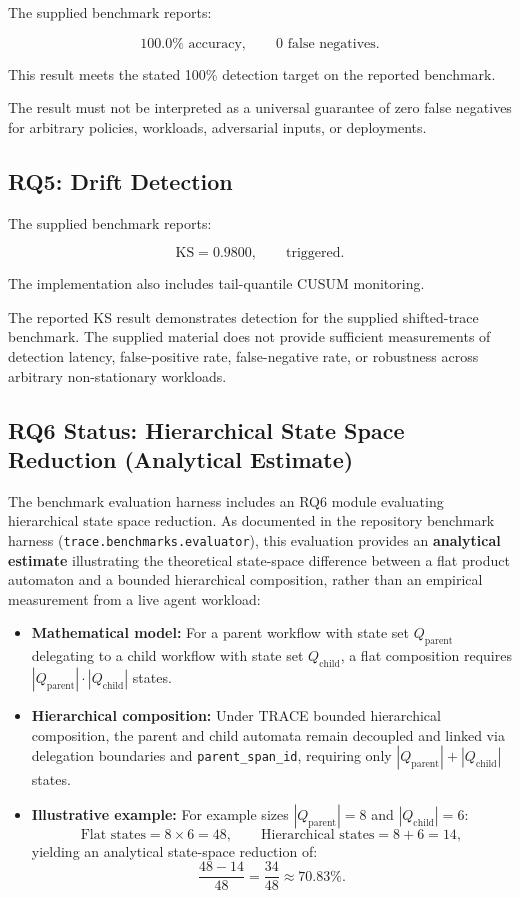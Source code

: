 \documentclass[11pt,a4paper]{article}
\begin{document}
The supplied benchmark reports:

\[
100.0\%\text{ accuracy},
\qquad
0\text{ false negatives}.
\]

This result meets the stated 100\% detection target on the reported benchmark.

The result must not be interpreted as a universal guarantee of zero false negatives for
arbitrary policies, workloads, adversarial inputs, or deployments.

\subsection{RQ5: Drift Detection}

The supplied benchmark reports:

\[
\mathrm{KS}=0.9800,
\qquad
\text{triggered}.
\]

The implementation also includes tail-quantile CUSUM monitoring.

The reported KS result demonstrates detection for the supplied shifted-trace benchmark.
The supplied material does not provide sufficient measurements of detection latency,
false-positive rate, false-negative rate, or robustness across arbitrary non-stationary
workloads.

\subsection{RQ6 Status: Hierarchical State Space Reduction (Analytical Estimate)}

The benchmark evaluation harness includes an RQ6 module evaluating hierarchical state space
reduction. As documented in the repository benchmark harness (\texttt{trace.benchmarks.evaluator}),
this evaluation provides an \textbf{analytical estimate} illustrating the theoretical state-space
difference between a flat product automaton and a bounded hierarchical composition, rather than
an empirical measurement from a live agent workload:

\begin{itemize}
\item \textbf{Mathematical model:} For a parent workflow with state set $Q_{\text{parent}}$
delegating to a child workflow with state set $Q_{\text{child}}$, a flat composition
requires $|Q_{\text{parent}}| \cdot |Q_{\text{child}}|$ states.
\item \textbf{Hierarchical composition:} Under TRACE bounded hierarchical composition,
the parent and child automata remain decoupled and linked via delegation boundaries
and \texttt{parent\_span\_id}, requiring only $|Q_{\text{parent}}| + |Q_{\text{child}}|$ states.
\item \textbf{Illustrative example:} For example sizes $|Q_{\text{parent}}|=8$ and
$|Q_{\text{child}}|=6$:
\[
\text{Flat states} = 8 \times 6 = 48, \qquad
\text{Hierarchical states} = 8 + 6 = 14,
\]
yielding an analytical state-space reduction of:
\[
\frac{48 - 14}{48} = \frac{34}{48} \approx \mathbf{70.83\%}.
\]
\end{itemize}
\end{document}
